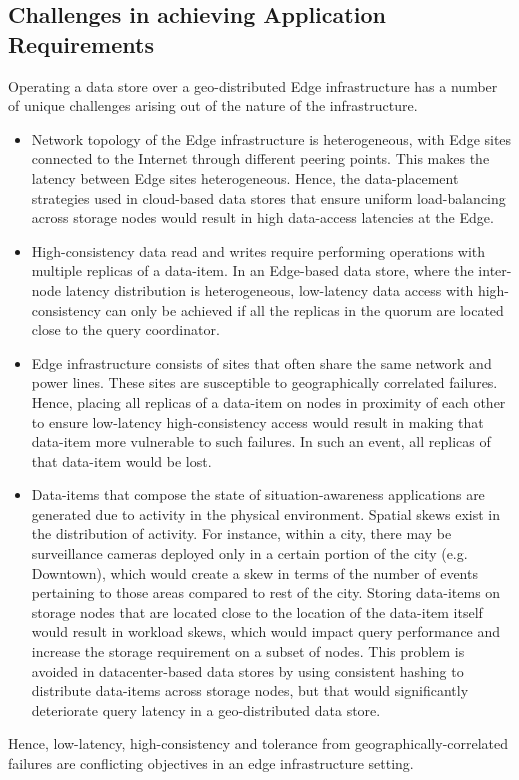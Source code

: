 \subsection{Challenges in achieving Application Requirements}
Operating a data store over a geo-distributed Edge infrastructure has a number of unique challenges arising out of the nature of the infrastructure.
\begin{itemize}
\item Network topology of the Edge infrastructure is heterogeneous, with Edge sites connected to the Internet through different peering points. This makes the latency between Edge sites heterogeneous. Hence, the data-placement strategies used in cloud-based data stores that ensure uniform load-balancing across storage nodes would result in high data-access latencies at the Edge.
\item High-consistency data read and writes require performing operations with multiple replicas of a data-item. In an Edge-based data store, where the inter-node latency distribution is heterogeneous, low-latency data access with high-consistency can only be achieved if all the replicas in the quorum are located close to the query coordinator.
\item Edge infrastructure consists of sites that often share the same network and power lines. These sites are susceptible to geographically correlated failures. Hence, placing all replicas of a data-item on nodes in proximity of each other to ensure low-latency high-consistency access would result in making that data-item more vulnerable to such failures. In such an event, all replicas of that data-item would be lost.
\item Data-items that compose the state of situation-awareness applications are generated due to activity in the physical environment. Spatial skews exist in the distribution of activity. For instance, within a city, there may be surveillance cameras deployed only in a certain portion of the city (e.g. Downtown), which would create a skew in terms of the number of events pertaining to those areas compared to rest of the city. Storing data-items on storage nodes that are located close to the location of the data-item itself would result in workload skews, which would impact query performance and increase the storage requirement on a subset of nodes. This problem is avoided in datacenter-based data stores by using consistent hashing \cite{consistent_hashing} to distribute data-items across storage nodes, but that would significantly deteriorate query latency in a geo-distributed data store.
\end{itemize}
Hence, low-latency, high-consistency and tolerance from geographically-correlated failures are conflicting objectives in an edge infrastructure setting.

